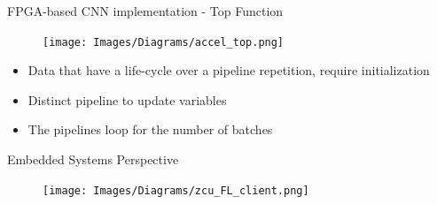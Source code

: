 \begin{frame}{FPGA-based CNN implementation - Top Function}
	\begin{minipage}{0.25\textwidth}
    	\begin{figure}[H]
            \centering
    		\texttt{[image: Images/Diagrams/accel\_top.png]}
    	\end{figure}%
	\end{minipage}%
	\begin{minipage}{0.75\textwidth}
    	\begin{itemize}
        	\item Data that have a life-cycle over a pipeline repetition, require initialization
    	    \item Distinct pipeline to update variables
            \item The pipelines loop for the number of batches
    	\end{itemize}
	\end{minipage}%
\end{frame}

    
    
    

\begin{frame}{Embedded Systems Perspective}
    	\begin{figure}[H]
            \centering
    		\texttt{[image: Images/Diagrams/zcu\_FL\_client.png]}
    	\end{figure}%
\end{frame}